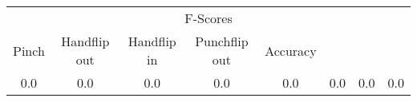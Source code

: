 \documentclass{standalone}
\begin{document}
 
 \begin{tabular}{|c|c|c|c|c|c|c ||c|}
\cline{1-8}\multicolumn{8}{|c|}{F-Scores} \\ 
\cline{1-8}Pinch & Handflip out & Handflip in & Punchflip out & Accuracy\\ 
\cline{1-8}0.0 & 0.0 & 0.0 & 0.0 & 0.0 & 0.0 & 0.0 & 0.0\\ 
 \cline{1-8}\hline \end{tabular}
 
\end{document}

